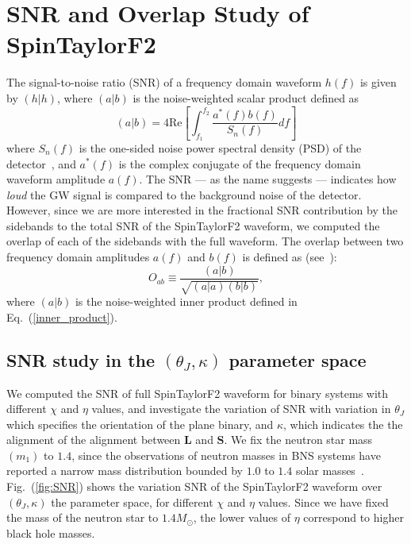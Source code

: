 
\chapter{SNR and Overlap Study of SpinTaylorF2}

The signal-to-noise ratio (SNR) of a frequency domain waveform $h(f)$ is given by 
$(h|h)$, where $(a|b)$ is the noise-weighted scalar product defined as 
\label{inner_product}  
\begin{equation} (a|b) = 4 \text{Re} \left[
\int_{f_{1}}^{f_{2}}  \dfrac{a^{*}(f)b(f)}{S_{n}(f)} df\right] 
\end{equation}
where $S_{n}(f)$ is the one-sided noise power spectral density (PSD) of the
detector~\cite{PSD}, and $a^{*}(f)$ is the complex conjugate of the frequency
domain waveform amplitude $a(f)$. The SNR --- as the name suggests ---
indicates how \textit{loud} the GW signal is compared to the background noise
of the detector. However, since we are more interested in the fractional SNR
contribution by the sidebands to the total SNR of the SpinTaylorF2 waveform,
we computed the overlap of each of the sidebands with the full waveform. The
overlap between two frequency domain amplitudes $a(f)$ and $b(f)$ is defined
as (see~\cite{Lundgren2014}):
\begin{equation} 
O_{ab} \equiv \dfrac{(a|b)}{\sqrt{(a|a)(b|b)}},
\end{equation} 
where $(a|b)$ is the noise-weighted inner product defined in
Eq.~(\ref{inner_product}). 

\section{SNR study in the $(\theta_J, \kappa)$ parameter space}

We computed the SNR of full SpinTaylorF2 waveform for binary systems
with  different $\chi$ and $\eta$ values, and investigate the variation of SNR
with variation in $\theta_{J}$ which specifies the orientation of the plane
binary, and $\kappa$, which indicates the the alignment of the alignment between
$\mathbf{L}$ and $\mathbf{S}$. We fix the neutron star mass $(m_{1})$ to $1.4$,
since the observations of neutron masses in BNS systems have reported a narrow
mass distribution bounded by $1.0$ to $1.4$ solar masses~\cite{Lorimer}.
Fig.~(\ref{fig:SNR}) shows the variation SNR of the SpinTaylorF2 waveform   over
$(\theta_J, \kappa)$ the parameter space, for different $\chi$ and $\eta$
values. Since we have fixed the mass of the neutron star to $1.4 M_{\odot}$, the
lower values of $\eta$ correspond to higher black hole masses.

